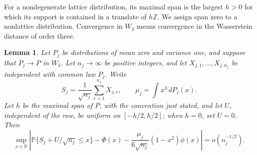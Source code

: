 \documentclass[aop]{imsart}
\theoremstyle{plain}
\newtheorem{lemma}[theorem]{Lemma}
\theoremstyle{definition}
\theoremstyle{definition}
\newcommand{\PP}{\mathbb P}
\newcommand{\R}{\mathbb R}
\begin{document}
For a nondegenerate lattice distribution, its maximal span is the largest
\(h>0\) for which its support is contained in a translate of \(h\mathbb Z\).
We assign span zero to a nonlattice distribution.  Convergence in \(W_3\)
means convergence in the Wasserstein distance of order three.

\begin{lemma}\label{lem:jitter}
Let \(P_j\) be distributions of mean zero and variance one, and suppose
that \(P_j\to P\) in \(W_3\).  Let \(n_j\to\infty\) be positive integers,
and let \(X_{j,1},\ldots,X_{j,n_j}\) be independent with common law
\(P_j\).  Write
\[
 S_j=\frac1{\sqrt{n_j}}\sum_{r=1}^{n_j}X_{j,r},\qquad
 \mu_j=\int x^3\,dP_j(x).
\]
Let \(h\) be the maximal span of \(P\), with the convention just stated,
and let \(U\), independent of the row, be uniform on \([-h/2,h/2]\);
when \(h=0\), set \(U=0\).  Then
\begin{equation}\label{eq:jitter-expansion}
 \sup_{x\in\R}\left|
 \PP\{S_j+U/\sqrt{n_j}\le x\}
 -\Phi(x)-\frac{\mu_j}{6\sqrt{n_j}}(1-x^2)\phi(x)
 \right|=o(n_j^{-1/2}).
\end{equation}
\end{lemma}
\end{document}
